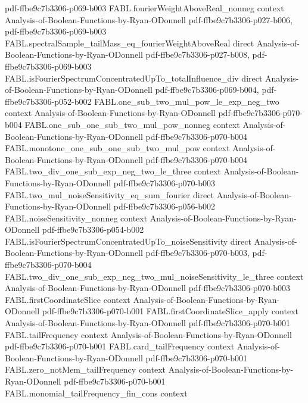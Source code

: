 \begin{theorem}
  {pdf-ffbe9c7b3306-p069-b003}
\proofstep
  {FABL.fourierWeightAboveReal_nonneg}
  {context}
  {Analysis-of-Boolean-Functions-by-Ryan-ODonnell}
  {pdf-ffbe9c7b3306-p027-b006,
    pdf-ffbe9c7b3306-p069-b003}
\proofstep
  {FABL.spectralSample_tailMass_eq_fourierWeightAboveReal}
  {direct}
  {Analysis-of-Boolean-Functions-by-Ryan-ODonnell}
  {pdf-ffbe9c7b3306-p027-b008,
    pdf-ffbe9c7b3306-p069-b003}
\proofstep
  {FABL.isFourierSpectrumConcentratedUpTo_totalInfluence_div}
  {direct}
  {Analysis-of-Boolean-Functions-by-Ryan-ODonnell}
  {pdf-ffbe9c7b3306-p069-b004,
    pdf-ffbe9c7b3306-p052-b002}
\proofstep
  {FABL.one_sub_two_mul_pow_le_exp_neg_two}
  {context}
  {Analysis-of-Boolean-Functions-by-Ryan-ODonnell}
  {pdf-ffbe9c7b3306-p070-b004}
\proofstep
  {FABL.one_sub_one_sub_two_mul_pow_nonneg}
  {context}
  {Analysis-of-Boolean-Functions-by-Ryan-ODonnell}
  {pdf-ffbe9c7b3306-p070-b004}
\proofstep
  {FABL.monotone_one_sub_one_sub_two_mul_pow}
  {context}
  {Analysis-of-Boolean-Functions-by-Ryan-ODonnell}
  {pdf-ffbe9c7b3306-p070-b004}
\proofstep
  {FABL.two_div_one_sub_exp_neg_two_le_three}
  {context}
  {Analysis-of-Boolean-Functions-by-Ryan-ODonnell}
  {pdf-ffbe9c7b3306-p070-b003}
\proofstep
  {FABL.two_mul_noiseSensitivity_eq_sum_fourier}
  {direct}
  {Analysis-of-Boolean-Functions-by-Ryan-ODonnell}
  {pdf-ffbe9c7b3306-p056-b002}
\proofstep
  {FABL.noiseSensitivity_nonneg}
  {context}
  {Analysis-of-Boolean-Functions-by-Ryan-ODonnell}
  {pdf-ffbe9c7b3306-p054-b002}
\proofstep
  {FABL.isFourierSpectrumConcentratedUpTo_noiseSensitivity}
  {direct}
  {Analysis-of-Boolean-Functions-by-Ryan-ODonnell}
  {pdf-ffbe9c7b3306-p070-b003,
    pdf-ffbe9c7b3306-p070-b004}
\proofstep
  {FABL.two_div_one_sub_exp_neg_two_mul_noiseSensitivity_le_three}
  {context}
  {Analysis-of-Boolean-Functions-by-Ryan-ODonnell}
  {pdf-ffbe9c7b3306-p070-b003}
\proofstep
  {FABL.firstCoordinateSlice}
  {context}
  {Analysis-of-Boolean-Functions-by-Ryan-ODonnell}
  {pdf-ffbe9c7b3306-p070-b001}
\proofstep
  {FABL.firstCoordinateSlice_apply}
  {context}
  {Analysis-of-Boolean-Functions-by-Ryan-ODonnell}
  {pdf-ffbe9c7b3306-p070-b001}
\proofstep
  {FABL.tailFrequency}
  {context}
  {Analysis-of-Boolean-Functions-by-Ryan-ODonnell}
  {pdf-ffbe9c7b3306-p070-b001}
\proofstep
  {FABL.card_tailFrequency}
  {context}
  {Analysis-of-Boolean-Functions-by-Ryan-ODonnell}
  {pdf-ffbe9c7b3306-p070-b001}
\proofstep
  {FABL.zero_notMem_tailFrequency}
  {context}
  {Analysis-of-Boolean-Functions-by-Ryan-ODonnell}
  {pdf-ffbe9c7b3306-p070-b001}
\proofstep
  {FABL.monomial_tailFrequency_fin_cons}
  {context}

\end{theorem}
